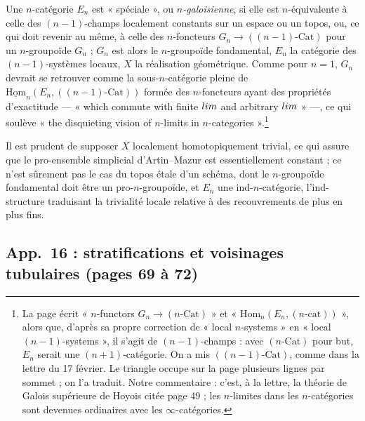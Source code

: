 \documentclass[11pt,a4paper]{article}
\begin{document}

Une $n$-catégorie $E_n$ est « spéciale », ou \emph{$n$-galoisienne},
si elle est $n$-équivalente à celle des $(n-1)$-champs localement constants
sur un espace ou un topos, ou, ce qui doit revenir au même, à celle des
$n$-foncteurs $G_n \to ((n-1)\text{-}\mathrm{Cat})$ pour un $n$-groupoïde
$G_n$ ; $G_n$ est alors le $n$-groupoïde fondamental, $E_n$ la catégorie des
$(n-1)$-systèmes locaux, $X$ la réalisation géométrique. Comme pour $n=1$,
$G_n$ devrait se retrouver comme la sous-$n$-catégorie pleine de
$\underline{\mathrm{Hom}}_n(E_n,((n-1)\text{-}\mathrm{Cat}))$ formée des
$n$-foncteurs ayant des propriétés d'exactitude --- « which commute with
finite $\varprojlim$ and arbitrary $\varinjlim$ » ---, ce qui soulève « the
disquieting vision of $n$-limits in $n$-categories ».\footnote{La page écrit
« $n$-functors $G_n \to (n\text{-}\mathrm{Cat})$ » et
« $\mathrm{Hom}_n(E_n,(n\text{-}\mathrm{cat}))$ », alors que, d'après sa
propre correction de « local $n$-systems » en « local $(n-1)$-systems », il
s'agit de $(n-1)$-champs : avec $(n\text{-}\mathrm{Cat})$ pour but, $E_n$
serait une $(n+1)$-catégorie. On a mis $((n-1)\text{-}\mathrm{Cat})$, comme
dans la lettre du 17 février. Le triangle occupe sur la page plusieurs lignes
par sommet ; on l'a traduit. Notre commentaire : c'est, à la lettre, la
théorie de Galois supérieure de Hoyois citée page 49 ; les $n$-limites dans
les $n$-catégories sont devenues ordinaires avec les $\infty$-catégories.}

Il est prudent de supposer $X$ localement homotopiquement trivial, ce qui
assure que le pro-ensemble simplicial d'Artin--Mazur est essentiellement
constant ; ce n'est sûrement pas le cas du topos étale d'un schéma, dont le
$n$-groupoïde fondamental doit être un pro-$n$-groupoïde, et $E_n$ une
ind-$n$-catégorie, l'ind-structure traduisant la trivialité locale relative
à des recouvrements de plus en plus fins.

\subsection*{App.~16 : stratifications et voisinages tubulaires (pages 69 à 72)}
\end{document}
